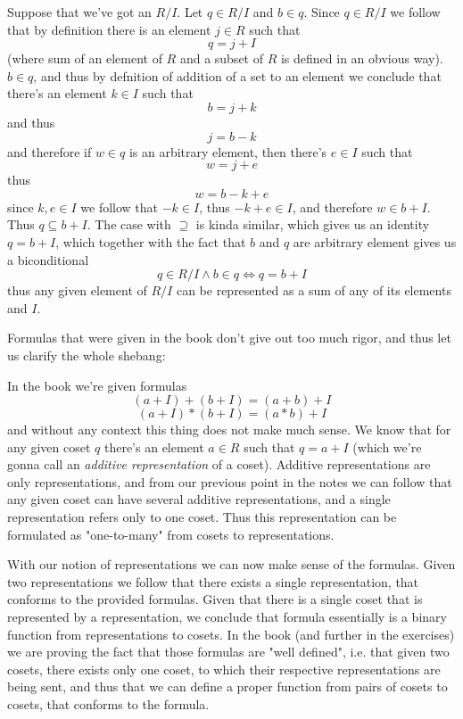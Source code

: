 \documentclass[11pt,oneside,titlepage]{book}
\DeclareMathOperator \lra {\Leftrightarrow}
\begin{document}
Suppose that we've got an $R/I$. Let $q \in R/I$ and $b \in q$.  Since
$q \in R/I$ we follow that by definition there is an element $j \in R$
such that
$$q = j + I$$
(where sum of an element of $R$ and a subset of $R$ is defined in an
obvious way). $b \in q$, and thus by defnition of addition of a set to
an element we conclude that there's an element $k \in I$
such that
$$b = j + k$$
and thus
$$j = b - k$$
and therefore if $w \in q$ is an arbitrary element, then there's $e
\in I$ such that
$$w = j + e$$ 
thus
$$w = b - k + e$$
since $k, e \in I$ we follow that $-k \in I$, thus $-k + e \in I$, and
therefore $w \in b + I$. Thus $q \subseteq b + I$. The case with
$\supseteq$ is kinda similar, which gives us an identity $q = b + I$,
which together with the fact that $b$ and $q$ are arbitrary element
gives us a biconditional
$$q \in R/I \land b \in q \lra q = b + I$$
thus any given element of $R/I$ can be represented as a sum of any of
its elements and $I$.

Formulas that were given in the book don't give out too much
rigor, and thus let us clarify the whole shebang:

In the book we're given formulas
$$(a + I) + (b + I) = (a + b) + I$$
$$(a + I) * (b + I) = (a * b) + I$$
and without any context this thing does not make much sense. We know
that for any given coset $q$ there's an element $a \in R$ such that $q
= a + I$ (which we're gonna call an \textit{additive representation}
of a coset). Additive representations are only representations, and
from our previous point in the notes we can follow that any given
coset can have several additive representations, and a single representation
refers only to one coset. Thus this representation can be formulated
as "one-to-many" from cosets to representations.

With our notion of representations we can now make sense of the
formulas. Given two representations we follow that there exists a
single representation, that conforms to the provided formulas. Given
that there is a single coset that is represented by a representation,
we conclude that formula essentially is a binary function from
representations to cosets. In the book (and further in the exercises)
we are proving the fact that those formulas are "well defined",
i.e. that given two cosets, there exists only one coset, to which
their respective representations are being sent, and thus that we can
define a proper function from pairs of cosets to cosets, that conforms
to the formula.
\end{document}
